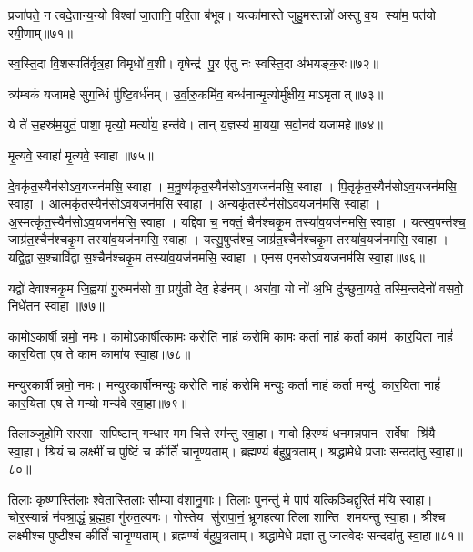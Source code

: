 प्रजा॑पते॒ न त्वदे॒तान्य॒न्यो विश्वा॑ जा॒तानि॒ परि॒ता ब॑भूव। यत्का॑मास्ते जुहु॒मस्तन्नो॑ अस्तु व॒य स्या॑म॒ पत॑यो रयी॒णाम्॥७१॥
\anuvakamend 

स्व॒स्ति॒दा वि॒शस्पति॑र्वृत्र॒हा विमृधो॑ व॒शी। वृषेन्द्र॑ पु॒र ए॑तु नः स्वस्ति॒दा अ॑भयङ्क॒रः॥७२॥
\anuvakamend 

त्र्य॑म्बकं यजामहे सुग॒न्धिं पु॑ष्टि॒वर्ध॑नम्। उ॒र्वा॒रु॒कमि॑व॒ बन्ध॑नान्मृ॒त्योर्मु॑क्षीय॒ माऽमृतात्॥७३॥
\anuvakamend 

ये ते॑ स॒हस्र॑म॒युतं॒ पाशा॒ मृत्यो॒ मर्त्या॑य॒ हन्त॑वे। तान् य॒ज्ञस्य॑ मा॒यया॒ सर्वा॒नव॑ यजामहे॥७४॥\anuvakamend
 
मृ॒त्यवे॒ स्वाहा॑ मृ॒त्यवे॒ स्वाहा॥७५॥%
\anuvakamend 

दे॒वकृ॑त॒स्यैन॑सोऽव॒यजन॑मसि॒ स्वाहा। म॒नु॒ष्य॑कृत॒स्यैन॑सो\-ऽव॒यजन॑मसि॒ स्वाहा। 
पि॒तृकृ॑त॒स्यैन॑सो\-ऽव॒यजन॑मसि॒ स्वाहा। आ॒त्मकृ॑त॒स्यैन॑सो\-ऽव॒यजन॑मसि॒ स्वाहा। 
अ॒न्यकृ॑त॒स्यैन॑सो\-ऽव॒यजन॑मसि॒ स्वाहा। अ॒स्मत्कृ॑त॒स्यैन॑सो\-ऽव॒यजन॑मसि॒ स्वाहा। 
यद्दि॒वा च॒ नक्तं॒ चैन॑श्चकृ॒म तस्या॑व॒यज॑नमसि॒ स्वाहा। यत्स्व॒पन्त॑श्च॒ जाग्र॑त॒श्चैन॑श्चकृ॒म तस्या॑व॒यज॑नमसि॒ स्वाहा। 
यत्सु॒षुप्त॑श्च॒ जाग्र॑त॒श्चैन॑श्चकृ॒म तस्या॑व॒यज॑नमसि॒ स्वाहा। यद्वि॒द्वास॒श्चावि॑द्वास॒श्चैन॑श्चकृ॒म तस्या॑व॒यज॑नमसि॒ स्वाहा। एनस एनसोऽवयजनम॑सि स्वा॒हा॥७६॥\anuvakamend

यद्वो॑ देवाश्चकृ॒म जि॒ह्वया॑ गु॒रुमन॑सो वा॒ प्रयु॑ती देव॒ हेड॑नम्। अरा॑वा॒ यो नो॑ अ॒भि दु॑च्छुना॒यते॒ तस्मि॒न्तदेनो॑ वसवो॒ निधे॑तन॒ स्वाहा॥७७॥ \anuvakamend



कामोऽकार्\mbox{}षीन्नमो॒ नमः।  कामोऽकार्\mbox{}षीत्कामः करोति नाहं करोमि कामः कर्ता नाहं कर्ता काम॑ कार॒यिता नाहं॑ कार॒यिता एष ते काम कामा॑य स्वा॒हा॥७८॥
\anuvakamend

मन्युरकार्\mbox{}षीन्नमो॒ नमः। मन्युरकार्\mbox{}षीन्मन्युः करोति नाहं करोमि मन्युः कर्ता नाहं कर्ता मन्यु॑ कार॒यिता नाहं॑ कार॒यिता एष ते मन्यो मन्य॑वे स्वा॒हा॥७९॥
\anuvakamend

तिलाञ्जुहोमि सरसा सपिष्टान् गन्धार मम चित्ते रम॑न्तु स्वा॒हा। गावो हिरण्यं धनमन्नपान सर्वेषा श्रि॑यै स्वा॒हा। श्रियं च लक्ष्मीं च पुष्टिं च कीर्तिं॑ चानृ॒ण्यताम्। ब्रह्मण्यं ब॑हुपु॒त्रताम्। श्रद्धामेधे प्रजाः सन्ददा॑तु स्वा॒हा॥८०॥
\anuvakamend

तिलाः कृष्णास्ति॑लाः श्वे॒ता॒स्तिलाः सौम्या व॑शानु॒गाः। तिलाः पुनन्तु॑ मे पा॒पं॒ यत्किञ्चिद्दुरितं म॑यि स्वा॒हा। चोर॒स्यान्नं न॑वश्रा॒द्धं॒ ब्र॒ह्म॒हा गु॑रुत॒ल्पगः। गोस्तेय सु॑रापा॒नं॒ भ्रूणहत्या तिला शान्ति शमय॑न्तु स्वा॒हा। श्रीश्च लक्ष्मीश्च पुष्टीश्च कीर्तिं॑ चानृ॒ण्यताम्। ब्रह्मण्यं ब॑हुपु॒त्रताम्। श्रद्धामेधे प्रज्ञा तु जातवेदः सन्ददा॑तु स्वा॒हा॥८१॥
 \anuvakamend

